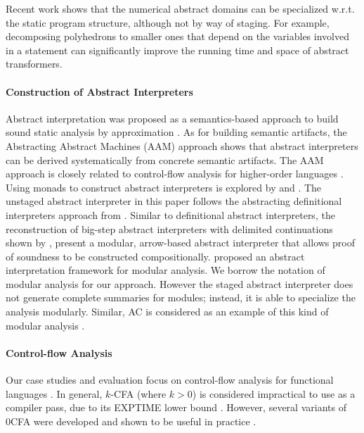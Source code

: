 Recent work shows that the numerical abstract domains can be
specialized w.r.t. the static program structure, although not by
way of staging. For example, decomposing polyhedrons
\cite{DBLP:conf/popl/SinghPV17, Singh:2017:PCD:3177123.3158143} to
smaller ones that depend on the variables involved in a statement can
significantly improve the running time and space of abstract
transformers.

\paragraph{Construction of Abstract Interpreters} Abstract interpretation
was proposed as a semantics-based approach to build sound static analysis by
approximation \cite{DBLP:conf/popl/CousotC77}. As for building semantic
artifacts, the Abstracting Abstract Machines (AAM)
\cite{DBLP:journals/jfp/HornM12, DBLP:conf/icfp/HornM10} approach
shows that abstract interpreters can be derived systematically from
concrete semantic artifacts. The AAM approach is closely related to
control-flow analysis for higher-order languages
\cite{Midtgaard:2012:CAF:2187671.2187672}.  Using monads to construct
abstract interpreters is explored by
\citet{Sergey:2013:MAI:2491956.2491979} and
\citet{DBLP:journals/pacmpl/DaraisLNH17,
  Darais:2015:GTM:2814270.2814308}.  The unstaged abstract interpreter
in this paper follows the abstracting definitional interpreters
approach from \citet{DBLP:journals/pacmpl/DaraisLNH17}.  Similar to
definitional abstract interpreters,
the reconstruction of big-step abstract interpreters with delimited
continuations shown by \citet{Wei:2018:RAA:3243631.3236800},
\citet{Keidel:2018:CSP:3243631.3236767} present a modular, arrow-based
abstract interpreter that allows proof of soundness to be constructed
compositionally. \citet{DBLP:conf/cc/CousotC02} proposed an abstract interpretation framework for
modular analysis. We borrow the notation of modular analysis for our approach.
However the staged abstract interpreter does not generate complete summaries for
modules; instead, it is able to specialize the analysis modularly. Similar, AC
is considered as an example of this kind of modular analysis \cite{DBLP:conf/cc/CousotC02}.

\paragraph{Control-flow Analysis} Our case studies and evaluation focus on
control-flow analysis for functional languages
\cite{Shivers:1991:SSC:115865.115884, Midtgaard:2012:CAF:2187671.2187672}. In
general, $k$-CFA (where $k > 0$) is considered impractical to use as a compiler
pass, due to its EXPTIME lower bound \cite{VanHorn:2008:DKC:1411204.1411243}.
However, several variants of 0CFA were developed and shown to be useful in
practice \cite{Adams:2011:FTR:2048066.2048105,
Bergstrom:2014:PEH:2628136.2628153, ashley:practical, Reppy:2006:TCA:1159876.1159888}.

